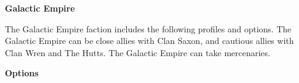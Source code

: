 \documentclass{article}
\begin{document}
{\Huge \textbf{Galactic Empire}}
\vspace{0.6cm}

\begin{minipage}{19cm}
    The Galactic Empire faction includes the following profiles and options.
    The Galactic Empire can be close allies with Clan Saxon, and cautious allies
    with Clan Wren and The Hutts. The Galactic Empire can take mercenaries.
\end{minipage}

\vspace{0.3cm}
{\scriptsize

\setlength\extrarowheight{1.5pt}


}
\vspace{0.6cm}

{\Large \textbf{Options}}
\end{document}
